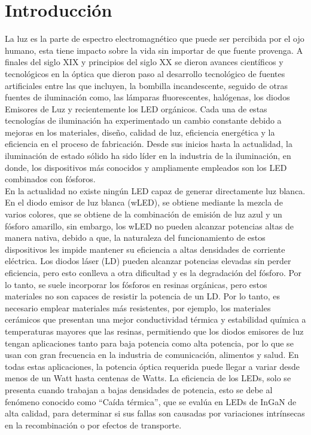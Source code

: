 \chapter{Introducción}
La luz es la parte de espectro electromagnético que puede ser percibida por el
ojo humano, esta tiene impacto sobre la vida sin importar de que fuente
provenga. A finales del siglo XIX y principios del siglo XX se dieron avances
científicos y tecnológicos en la óptica que dieron paso al desarrollo tecnológico
de fuentes artificiales entre las que incluyen, la bombilla incandescente,
seguido de otras fuentes de iluminación como, las lámparas fluorescentes,
halógenas, los diodos Emisores de Luz y recientemente los LED orgánicos\cite{Sustentable2014}.
Cada una de estas tecnologías de iluminación ha
experimentado un cambio constante debido a mejoras en los materiales,
diseño, calidad de luz, eficiencia energética y la eficiencia en el proceso de
fabricación. Desde sus inicios hasta la actualidad, la iluminación de estado
sólido ha sido líder en la industria de la iluminación, en donde,
los dispositivos más conocidos y ampliamente empleados son los LED combinados
con fósforos\cite{ISR-UniversidaddeCoimbra2017,Bernal2016}.\\

En la actualidad no existe ningún LED capaz de generar directamente luz blanca. 
En el diodo emisor de luz blanca (wLED), se obtiene mediante la mezcla de
varios colores, que
se obtiene de la combinación de emisión de luz azul y un fósforo amarillo,
sin embargo, los wLED no pueden alcanzar potencias altas de manera nativa,
debido a que, la naturaleza del funcionamiento de estos dispositivos
les impide mantener
su eficiencia a altas densidades de corriente eléctrica. Los diodos
láser (LD) pueden alcanzar potencias elevadas sin perder eficiencia, pero esto
conlleva a otra dificultad y es la degradación del fósforo. Por lo tanto,
se suele incorporar los fósforos en resinas orgánicas, pero estos
materiales no son capaces de resistir la potencia de un LD. Por lo tanto, es
necesario emplear materiales más resistentes, por ejemplo, los materiales
cerámicos que presentan una mejor conductividad térmica y estabilidad química a
temperaturas mayores que las resinas\cite{AlvarezJauregui2020}, permitiendo que los diodos
emisores de luz tengan aplicaciones tanto para baja potencia como alta
potencia, por lo que se usan con gran frecuencia en la industria de comunicación,
alimentos y
salud. En todas estas aplicaciones, la potencia óptica requerida puede llegar a
variar desde menos de un Watt hasta centenas de Watts. La eficiencia de los
LEDs, solo se presenta cuando trabajan a bajas densidades de potencia, esto se
debe al fenómeno conocido como “Caída térmica”, que se evalúa en LEDs
de InGaN de alta calidad, para determinar si sus fallas son
causadas por variaciones intrínsecas en la recombinación o por efectos de
transporte\cite{Baur2018}.\\

